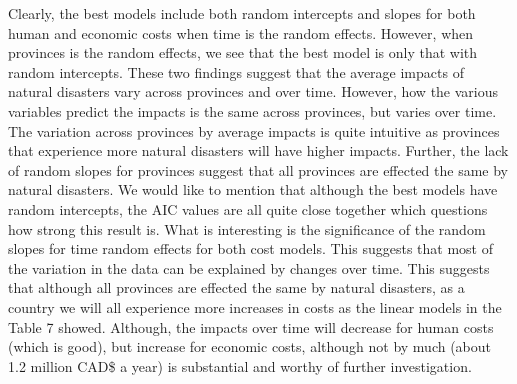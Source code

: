 Clearly, the best models include both random intercepts and slopes for both human and economic costs when time is the random effects. However, when provinces is the random effects, we see that the best model is only that with random intercepts. These two findings suggest that the average impacts of natural disasters vary across provinces and over time. However, how the various variables predict the impacts is the same across provinces, but varies over time. The variation across provinces by average impacts is quite intuitive as provinces that experience more natural disasters will have higher impacts. Further, the lack of random slopes for provinces suggest that all provinces are effected the same by natural disasters.
We would like to mention that although the best models have random intercepts, the AIC values are all quite close together which questions how strong this result is. What is interesting is the significance of the random slopes for time random effects for both cost models. This suggests that most of the variation in the data can be explained by changes over time. This suggests that although all provinces are effected the same by natural disasters, as a country we will all experience more increases in costs as the linear models in the Table 7 showed. Although, the impacts over time will decrease for human costs (which is good), but increase for economic costs, although not by much (about 1.2 million CAD\$ a year) is substantial and worthy of further investigation.















